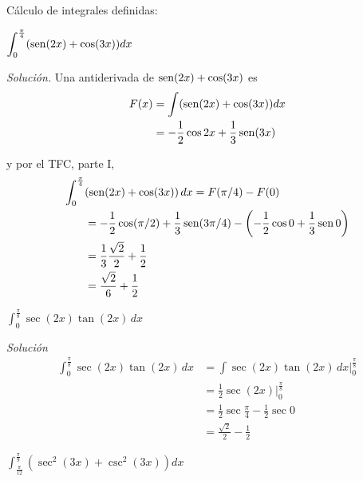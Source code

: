 \clearpage

\begin{ejemplo}
Cálculo de integrales definidas:
\end{ejemplo}

\begin{parrafonumerado}
\item $\displaystyle{\int_{0}^{\frac{\pi }{4}}(\operatorname{sen}(2x)+\cos (3x))dx}$

\vspace{\baselineskip}

\emph{Solución.} Una antiderivada de $\operatorname{sen} (2x)+\cos (3x)$ es
\begin{align*}
F(x) & =\int (\operatorname{sen} (2x)+\cos (3x))dx\\
& =-\frac{1}{2}\cos 2x+\frac{1}{3}\operatorname{sen} (3x)
\end{align*}

y por el TFC, parte I,
\begin{align*}
\int_{0}^{\frac{\pi }{4}}&(\operatorname{sen} (2x)+\cos (3x))\,dx=F(\pi/4)-F(0)\\
&=-\frac{1}{2}\cos(\pi/2)+\frac{1}{3}\operatorname{sen} (3\pi/4)-\left(-\frac{1}{2}\cos 0+\frac{1}{3}\operatorname{sen} 0\right)\\
&=\frac{1}{3}\frac{\sqrt{2}}{2}+\frac{1}{2}\\
&=\frac{\sqrt{2}}{6}+\frac{1}{2}
\end{align*}

\item $\displaystyle{\int_{0}^{\frac{\pi }{8}}\sec (2x)\tan (2x)\,dx}$

\vspace{\baselineskip}

\emph{Solución}
\begin{align*}
\int_{0}^{\frac{\pi }{8}}\sec (2x)\tan (2x)\,dx&=\int \sec(2x)\tan(2x)\,dx \Big|_{0}^{\frac{\pi }{8}}\\
&=\frac{1}{2}\sec(2x)\Big|_{0}^{\frac{\pi }{8}}\\
&=\frac{1}{2}\sec \frac{\pi }{4}-\frac{1}{2}\sec0\\
&=\frac{\sqrt{2}}{2}-\frac{1}{2}
\end{align*}

\item $\displaystyle{\int_{\frac{\pi }{12}}^{\frac{\pi }{9}}(\sec ^{2}(3x)+\csc^{2}(3x))dx}$

\vspace{\baselineskip}


\end{parrafonumerado}
